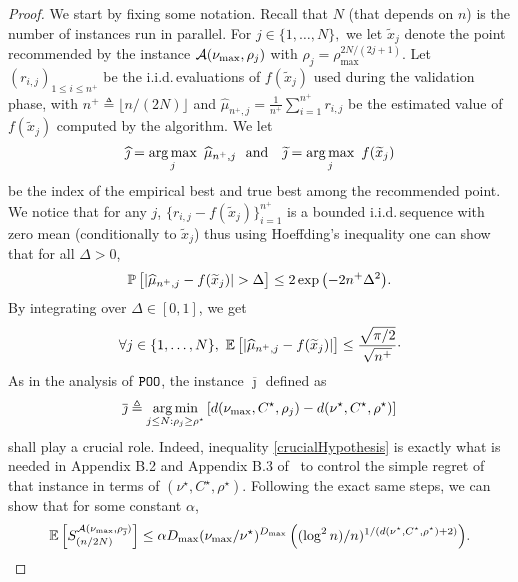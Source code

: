 \begin{proof} 
We start by fixing some notation. Recall that $N$ (that depends on $n$) is the number of instances run in parallel. For $j \in \{1,\dots,N\},$ we let $\tilde{x}_j$ denote the point recommended by the instance $\mathcal{A}(\nu_{\max},\rho_{j})$ with $\rho_j = \rho_{\max}^{2N/(2j+1)}$. Let $(r_{i,j})_{1 \leq i \leq n^+}$ be the i.i.d.\,evaluations of $f(\tilde{x}_j)$ used during the validation phase, with $n^+ \triangleq \lfloor n/(2N)\rfloor$ and $\hat{\mu}_{n^+,j} = \frac{1}{n^+}\sum_{i=1}^{n^+} r_{i,j}$ be the estimated value of $f(\tilde{x}_j)$ computed by the algorithm. We let \[\hat{\jmath} = \argmax_j \ \hat{\mu}_{n^+,j} \ \ \text{and} \ \ \ \tilde{\jmath} = \argmax_j \ f(\tilde{x}_j)\] 
be the index of the empirical best and true best among the recommended point. 
We notice that for any $j$, $\{r_{i,j}-f(\tilde{x}_{j})\}_{i=1}^{n^+}$ is a bounded i.i.d.\,sequence with zero mean (conditionally to $\tilde{x}_j$) thus using Hoeffding's inequality one can show that for all $\Delta > 0$,
\[
    \mathbb{P}\left[\lvert\widehat{\mu}_{n^+,j}-f(\widetilde x_{j})\rvert > \Delta\right] \leq 2\exp{\left(-2n^+\Delta^2\right)}.
\]
By integrating over $\Delta\in [0,1]$, we get
\begin{equation}\label{eq:azuma}
    \forall j\in \{1,\dots,N\}, \ \EE{\abs{\hat{\mu}_{n^+,j}-f(\tilde{x}_{j})}} \leq \frac{\sqrt{\pi/2}}{\sqrt{n^+}}\cdot
\end{equation}
As in the analysis of $\texttt{POO}$, the instance $\overline{\jmath}$ defined as   
\[
	\overline{\jmath} \triangleq \underset{j \leq N : \rho_j\geq\rho^\star}{\operatorname*{arg\,min}} \left[d(\nu_{\max},C^\star,\rho_j) - d(\nu^\star,C^\star,\rho^\star)\right]
\]
shall play a crucial role. Indeed, inequality \eqref{crucialHypothesis} is exactly what is needed in Appendix B.2 and Appendix B.3 of~\cite{grill2015poo} to control the simple regret of that instance in terms of $(\nu^\star,C^\star,\rho^\star)$. Following the exact same steps, we can show that for some constant $\alpha$, 
\begin{equation}\label{eq:regretjbar}
    \mathbb{E}\left[S_{(n/2N)}^{\mathcal{A}(\nu_{\max},\rho_{\overline{\jmath}})}\right]  \leq \alpha D_{\max}(\nu_{\max}/\nu^\star)^{D_{\max}} \left( (\log^2 n)/n)^{1/(d(\nu^\star, C^\star,\rho^\star)+2)} \right)\!.
\end{equation} 

\end{proof}
